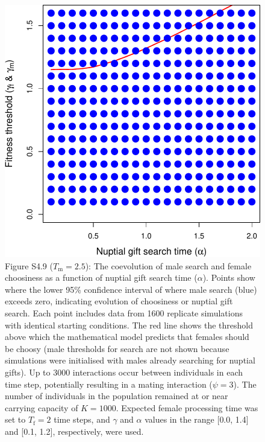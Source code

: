 \documentclass[
]{article}
\begin{document}
\captionsetup{labelformat=default}

\clearpage

\captionsetup{labelformat=empty}

\begin{figure}
\centering
\includegraphics{ms_refs_fixed_files/figure-latex/unnamed-chunk-14-1.pdf}
\caption{Figure S4.9 (\(T_{\mathrm{m}} = 2.5\)): The coevolution of male
search and female choosiness as a function of nuptial gift search time
(\(\alpha\)). Points show where the lower 95\% confidence interval of
where male search (blue) exceeds zero, indicating evolution of
choosiness or nuptial gift search. Each point includes data from 1600
replicate simulations with identical starting conditions. The red line
shows the threshold above which the mathematical model predicts that
females should be choosy (male thresholds for search are not shown
because simulations were initialised with males already searching for
nuptial gifts). Up to 3000 interactions occur between individuals in
each time step, potentially resulting in a mating interaction
(\(\psi = 3\)). The number of individuals in the population remained at
or near carrying capacity of \(K = 1000\). Expected female processing
time was set to \(T_{\mathrm{f}}=2\) time steps, and \(\gamma\) and
\(\alpha\) values in the range {[}0.0, 1.4{]} and {[}0.1, 1.2{]},
respectively, were used.}
\end{figure}
\end{document}
